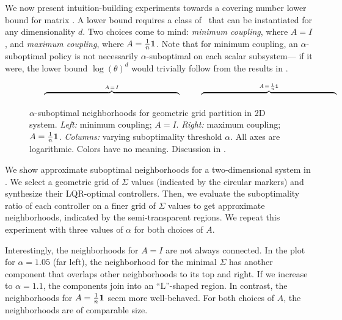 \label{sec:matrix-lb-ideas}

We now present intuition-building experiments towards a covering number lower bound
for matrix \DDFproblems.
A lower bound requires
a class of \DDFproblem\
that can be instantiated for any dimensionality $d$.
Two choices come to mind:
\emph{minimum coupling},
where $A = \textstyle I$,
and \emph{maximum coupling},
where $A = \textstyle \frac{1}{n} \mathbf{1}$.
Note that for minimum coupling,
an $\alpha$-suboptimal policy
is not necessarily $\alpha$-suboptimal on each scalar subsystem---%
if it were, the lower bound $\log (\theta)^d$ would trivially follow
from the results in \Cref{sec:results-scalar}.




\label{sec:2d-visualization}

\begin{figure}[t]
	\(
		\hspace{7mm}
		\overbrace{\hspace{65mm}}^{A \mathop{=} I}
		\hspace{10mm}
		\overbrace{\hspace{65mm}}^{A \mathop{=} \recip n \one}
	\)
	\vspace{-2mm}
	\caption{
		$\alpha$-suboptimal neighborhoods
		for geometric grid partition in 2D system.
		\emph{Left:}
		minimum coupling; $A = I$.
		\emph{Right:}
		maximum coupling; $A = \frac{1}{n} \mathbf{1}$.
		\emph{Columns:} varying suboptimality threshold $\alpha$.
		All axes are logarithmic. %
		Colors have no meaning.
		Discussion in .
	}
	\label{fig:neighborhoods-2x2}
\end{figure}


We show approximate suboptimal neighborhoods
for a two-dimensional system in .
We select a geometric grid of $\Sigma$ values (indicated by the circular markers)
and synthesize their LQR-optimal controllers.
Then, we evaluate the suboptimality ratio of each controller on a finer grid of $\Sigma$ values
to get approximate neighborhoods, indicated by the semi-transparent regions.
We repeat this experiment
with three values of $\alpha$
for both choices of $A$.

Interestingly, the neighborhoods for $A=I$ are not always connected.
In the plot for ${\alpha = 1.05}$ (far left),
the neighborhood for the minimal $\Sigma$
has another component that overlaps other neighborhoods
to its top and right.
If we increase to $\alpha = 1.1$,
the components join
into an ``L''-shaped region.
In contrast, the neighborhoods for $A = \frac{1}{n} \mathbf{1}$ seem more well-behaved.
For both choices of $A$,
the neighborhoods are of comparable size.


